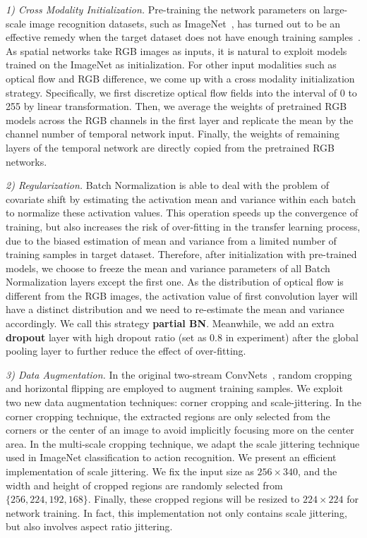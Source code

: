 \documentclass[10pt,journal,compsoc]{IEEEtran}
\begin{document}
\textit{1) Cross Modality Initialization.} 
Pre-training the network parameters on large-scale image recognition datasets, such as ImageNet~\cite{DengDSLL009}, has turned out to be an effective remedy when the target dataset does not have enough training samples~\cite{SimonyanZ14}. As spatial networks take RGB images as inputs, it is natural to exploit models trained on the ImageNet as initialization. For other input modalities such as optical flow and RGB difference, we come up with a cross modality initialization strategy. Specifically, we first discretize optical flow fields into the interval of 0 to 255 by linear transformation. Then, we average the weights of pretrained RGB models across the RGB channels in the first layer and replicate the mean by the channel number of temporal network input.  Finally, the weights of remaining layers of the temporal network are directly copied from the pretrained RGB networks.

\textit{2) Regularization.} 
Batch Normalization \cite{IoffeS15} is able to deal with the problem of covariate shift by estimating the activation mean and variance within each batch to normalize these activation values. This operation speeds up the convergence of training, but also increases the risk of over-fitting in the transfer learning process, due to the biased estimation of mean and variance from a limited number of training samples in target dataset. Therefore, after initialization with pre-trained models, we choose to freeze the mean and variance parameters of all Batch Normalization layers except the first one. As the distribution of optical flow is different from the RGB images, the activation value of first convolution layer will have a distinct distribution and we need to re-estimate the mean and variance accordingly. We call this strategy \textbf{partial BN}.
Meanwhile, we add an extra \textbf{dropout} layer with high dropout ratio (set as 0.8 in experiment) after the global pooling layer to further reduce the effect of over-fitting. 

\textit{3) Data Augmentation.} 
In the original two-stream ConvNets~\cite{SimonyanZ14}, random cropping and horizontal flipping are employed to augment training samples. We exploit two new data augmentation techniques: corner cropping and scale-jittering. In the corner cropping technique, the extracted regions are only selected from the corners or the center of an image to avoid implicitly focusing more on the center area. In the multi-scale cropping technique, we adapt the scale jittering technique \cite{SimonyanZ14a} used in ImageNet classification to action recognition. We present an efficient implementation of scale jittering. We fix the input size as $256 \times 340$, and the width and height of cropped regions are randomly selected from $\{256, 224, 192, 168\}$. Finally, these cropped regions will be resized to $224 \times 224$ for network training. In fact, this implementation not only contains scale jittering, but also involves aspect ratio jittering.
\end{document}

